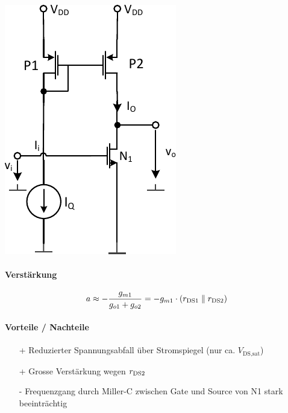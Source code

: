 \begin{minipage}[t]{0.25\columnwidth}
    \includegraphics[width=\columnwidth, align=t]{images/07_verstaerker_mit_stromquellenlast_2.pdf}
\end{minipage}
\hfill
\begin{minipage}[t]{0.45\columnwidth}
    \paragraph{Verstärkung}

    \vspace{-0.4cm}

    \[
        a \approx - \frac{g_{m1}}{g_{o1} + g_{o2}} = -g_{m1} \cdot \left( r_{\rm DS1} \parallel r_{\rm DS2} \right)
    \]

    \paragraph{Vorteile / Nachteile}
    \raggedright

     \begin{itemize}
        \item[+] Reduzierter Spannungsabfall über Stromspiegel (nur ca. $V_\text{DS,sat}$)
        \item[+] Grosse Verstärkung wegen $r_{\rm DS2}$
        \item[-] Frequenzgang durch Miller-C zwischen Gate und Source von N1 stark beeinträchtig
     \end{itemize}
\end{minipage}

